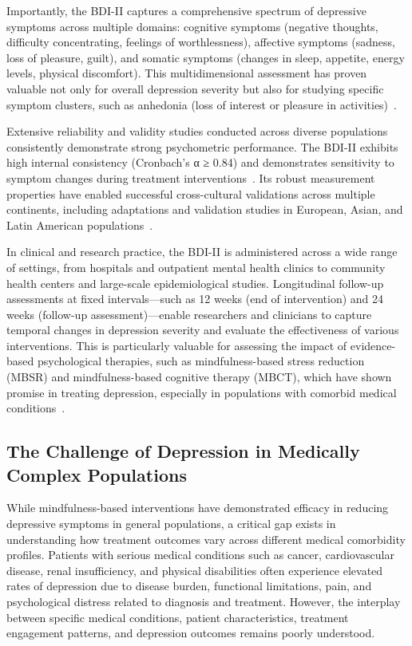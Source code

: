 \documentclass[conference]{IEEEtran}
\begin{document}
Importantly, the BDI-II captures a comprehensive spectrum of depressive symptoms across multiple domains: cognitive symptoms (negative thoughts, difficulty concentrating, feelings of worthlessness), affective symptoms (sadness, loss of pleasure, guilt), and somatic symptoms (changes in sleep, appetite, energy levels, physical discomfort). This multidimensional assessment has proven valuable not only for overall depression severity but also for studying specific symptom clusters, such as anhedonia (loss of interest or pleasure in activities)~\cite{pizzagalli2005reduced, treadway2009worth}. 

Extensive reliability and validity studies conducted across diverse populations consistently demonstrate strong psychometric performance. The BDI-II exhibits high internal consistency (Cronbach's α ≥ 0.84) and demonstrates sensitivity to symptom changes during treatment interventions~\cite{beck1996manual}. Its robust measurement properties have enabled successful cross-cultural validations across multiple continents, including adaptations and validation studies in European, Asian, and Latin American populations~\cite{wang2013psychometric, b4}.

In clinical and research practice, the BDI-II is administered across a wide range of settings, from hospitals and outpatient mental health clinics to community health centers and large-scale epidemiological studies. Longitudinal follow-up assessments at fixed intervals—such as 12 weeks (end of intervention) and 24 weeks (follow-up assessment)—enable researchers and clinicians to capture temporal changes in depression severity and evaluate the effectiveness of various interventions. This is particularly valuable for assessing the impact of evidence-based psychological therapies, such as mindfulness-based stress reduction (MBSR) and mindfulness-based cognitive therapy (MBCT), which have shown promise in treating depression, especially in populations with comorbid medical conditions~\cite{hunot2013mindfulness, b5}.

\subsection{The Challenge of Depression in Medically Complex Populations}

While mindfulness-based interventions have demonstrated efficacy in reducing depressive symptoms in general populations, a critical gap exists in understanding how treatment outcomes vary across different medical comorbidity profiles. Patients with serious medical conditions such as cancer, cardiovascular disease, renal insufficiency, and physical disabilities often experience elevated rates of depression due to disease burden, functional limitations, pain, and psychological distress related to diagnosis and treatment. However, the interplay between specific medical conditions, patient characteristics, treatment engagement patterns, and depression outcomes remains poorly understood.
\end{document}
